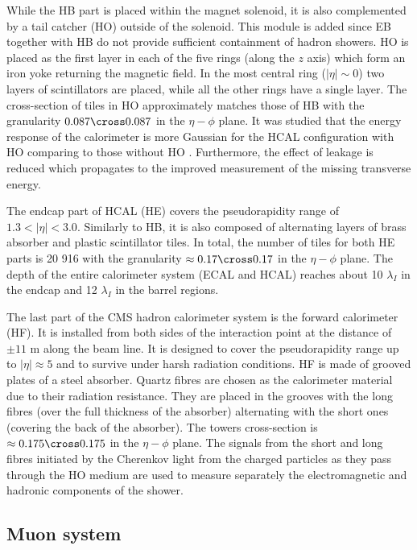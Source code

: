While the HB part is placed within the magnet solenoid, it is also complemented by a tail catcher (HO) outside of the solenoid. This module is added since EB together with HB do not provide sufficient containment of hadron showers. HO is placed as the first layer in each of the five rings (along the $z$ axis) which form an iron yoke returning the magnetic field. In the most central ring ($|\eta| \sim 0$) two layers of scintillators are placed, while all the other rings have a single layer. The cross-section of tiles in HO approximately matches those of HB with the granularity $0.087 \cross 0.087$ in the $\eta-\phi$ plane. It was studied that the energy response of the calorimeter is more Gaussian for the HCAL configuration with HO comparing to those without HO \cite{Banerjee:1999dka}. Furthermore, the effect of leakage is reduced which propagates to the improved measurement of the missing transverse energy.

The endcap part of HCAL (HE) covers the pseudorapidity range of $1.3 < |\eta| < 3.0$. Similarly to HB, it is also composed of alternating layers of brass absorber and plastic scintillator tiles. In total, the number of tiles for both HE parts is 20 916 with the granularity $\approx 0.17 \cross 0.17$ in the $\eta-\phi$ plane. The depth of the entire calorimeter system (ECAL and HCAL) reaches about 10 $\lambda_I$ in the endcap and 12 $\lambda_I$ in the barrel regions.

The last part of the CMS hadron calorimeter system is the forward calorimeter (HF). It is installed from both sides of the interaction point at the distance of $\pm 11$ m along the beam line. It is designed to cover the pseudorapidity range up to $|\eta| \approx 5$ and to survive under harsh radiation conditions. HF is made of grooved plates of a steel absorber. Quartz fibres are chosen as the calorimeter material due to their radiation resistance. They are placed in the grooves with the long fibres (over the full thickness of the absorber) alternating with the short ones (covering the back of the absorber). The towers cross-section is $\approx 0.175 \cross 0.175$ in the $\eta-\phi$ plane. The signals from the short and long fibres initiated by the Cherenkov light from the charged particles as they pass through the HO medium are used to measure separately the electromagnetic and hadronic components of the shower.


\subsection{Muon system}\label{sec:muon-system}

